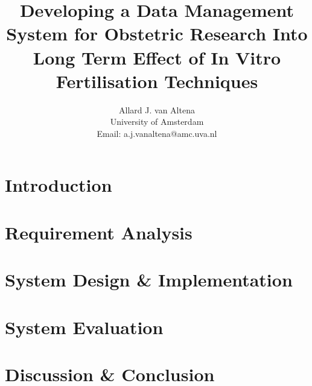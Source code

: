 \documentclass[a4paper]{report}
\title{Developing a Data Management System for Obstetric Research Into Long Term Effect of In Vitro Fertilisation Techniques}
\author{
	Allard J. van Altena\\
	University of Amsterdam\\
	Email: a.j.vanaltena@amc.uva.nl
}
\begin{document}
	
	\tableofcontents
	
	\chapter{Introduction}
	\label{introduction}
	
	
	
	\chapter{Requirement Analysis}
	\label{requirements}
	
	
	
	
	
	
	
	
	
	
	
	\chapter{System Design \& Implementation}
	\label{system-functionality}
	
	
	
	
	
	
	
	
	
	\chapter{System Evaluation}
	\label{evaluation}
	
	
	
	
	\chapter{Discussion \& Conclusion}
	\label{discussion}
	
\end{document}
